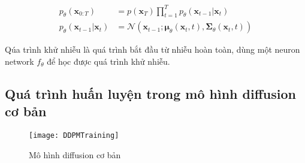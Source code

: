 
\begin{equation}
	\label{eq:denoising_process}
	\begin{aligned}
		p_\theta(\mathbf{x}_{0:T})
		&= p(\mathbf{x}_T) \prod^T_{t=1} p_\theta(\mathbf{x}_{t-1} \vert \mathbf{x}_t) \\
		p_\theta(\mathbf{x}_{t-1} \vert \mathbf{x}_t) &= \mathcal{N}(\mathbf{x}_{t-1};  \boldsymbol{\mu}_\theta(\mathbf{x}_t, t), \boldsymbol{\Sigma}_\theta(\mathbf{x}_t, t))
	\end{aligned}
\end{equation}

Qúa trình khử nhiễu là quá trình bắt đầu từ nhiễu hoàn toàn, dùng một neuron network $f_\theta$ để học được quá trình khử nhiễu.





\subsection{Quá trình huấn luyện trong mô hình diffusion cơ bản}
	
	\begin{figure}[H]
		\centering
		\texttt{[image: DDPMTraining]}
		\caption{Mô hình diffusion cơ bản}
		\label{fig:basic_diffusion}
	\end{figure}
	
